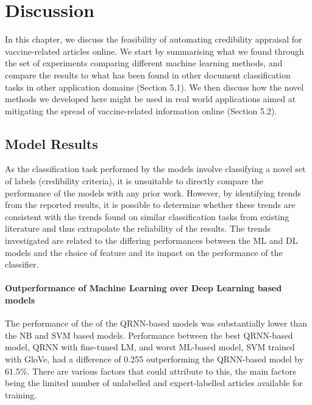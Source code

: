 \documentclass[a4paper,twoside,phd]{BYUPhys}
\begin{document}
\chapter{Discussion}
\label{chap:Discussion}


In this chapter, we discuss the feasibility of automating credibility appraisal for vaccine-related articles online.  We start by summarising what we found through the set of experiments comparing different machine learning methods, and compare the results to what has been found in other document classification tasks in other application domains (Section 5.1). We then discuss how the novel methods we developed here might be used in real world applications aimed at mitigating the spread of vaccine-related information online (Section 5.2).

\section{Model Results}
\label{sec:ModelResults}

As the classification task performed by the models involve classifying a novel set of labels (credibility criteria), it is unsuitable to directly compare the performance of the models with any prior work. However, by identifying trends from the reported results, it is possible to determine whether these trends are consistent with the trends found on similar classification tasks from existing literature and thus extrapolate the reliability of the results. The trends investigated are related to the differing performances between the ML and DL models and the choice of feature and its impact on the performance of the classifier.

\subsubsection{Outperformance of Machine Learning over Deep Learning based models}

The performance of the of the QRNN-based models was substantially lower than the NB and SVM based models. Performance between the best QRNN-based model, QRNN with fine-tuned LM, and worst ML-based model, SVM trained with GloVe, had a difference of 0.255 outperforming the QRNN-based model by 61.5\%. There are various factors that could attribute to this, the main factors being the limited number of unlabelled and expert-labelled articles available for training. \newline
\end{document}
